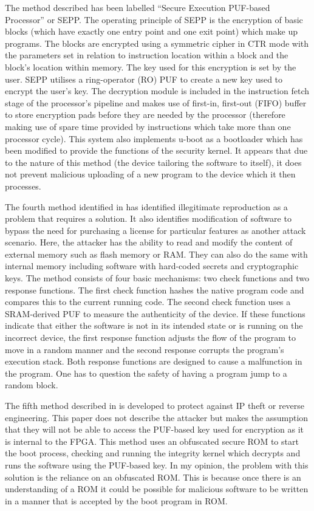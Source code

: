 The method described has been labelled ``Secure Execution PUF-based Processor'' or SEPP. The operating principle of SEPP is the encryption of basic blocks (which have exactly one entry point and one exit point) which make up programs. The blocks are encrypted using a symmetric cipher in CTR mode with the parameters set in relation to instruction location within a block and the block's location within memory. The key used for this encryption is set by the user. SEPP utilises a ring-operator (RO) PUF to create a new key used to encrypt the user's key. The decryption module is included in the instruction fetch stage of the processor's pipeline and makes use of first-in, first-out (FIFO) buffer to store encryption pads before they are needed by the processor (therefore making use of spare time provided by instructions which take more than one processor cycle). This system also implements u-boot as a bootloader which has been modified to provide the functions of the security kernel. It appears that due to the nature of this method (the device tailoring the software to itself), it does not prevent malicious uploading of a new program to the device which it then processes.

The fourth method identified in \cite{Kohnhauser2015} has identified illegitimate reproduction as a problem that requires a solution. It also identifies modification of software to bypass the need for purchasing a license for particular features as another attack scenario. Here, the attacker has the ability to read and modify the content of external memory such as flash memory or RAM. They can also do the same with internal memory including software with hard-coded secrets and cryptographic keys. The method consists of four basic mechanisms: two check functions and two response functions. The first check function hashes the native program code and compares this to the current running code. The second check function uses a SRAM-derived PUF to measure the authenticity of the device. If these functions indicate that either the software is not in its intended state or is running on the incorrect device, the first response function adjusts the flow of the program to move in a random manner and the second response corrupts the program's execution stack. Both response functions are designed to cause a malfunction in the program. One has to question the safety of having a program jump to a random block.


The fifth method described in \cite{Gora2010} is developed to protect against IP theft or reverse engineering. This paper does not describe the attacker but makes the assumption that they will not be able to access the PUF-based key used for encryption as it is internal to the FPGA. This method uses an obfuscated secure ROM to start the boot process, checking and running the integrity kernel which decrypts and runs the software using the PUF-based key. In my opinion, the problem with this solution is the reliance on an obfuscated ROM. This is because once there is an understanding of a ROM it could be possible for malicious software to be written in a manner that is accepted by the boot program in ROM.

